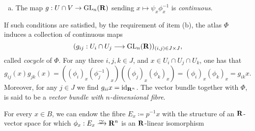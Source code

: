 \begin{definition}
\begin{enumerate}[(a)]
\item The map \(g: U \cap V \to \operatorname{GL}_n(\mathbf{R})\) sending
  \(x \mapsto \psi_x \phi_x^{-1}\) is \emph{continuous}.
\end{enumerate}
If such conditions are satisfied, by the requirement of item (b), the atlas
\(\Phi\) induces a collection of continuous maps
\[
(g_{i j}: U_i \cap U_j \longrightarrow \operatorname{GL}_n(\mathbf{R}))_{(i, j) \in J \times J},
\]
called \emph{cocycle} of \(\Phi\). For any three \(i, j, k \in J\), and
\(x \in U_i \cap U_j \cap U_k\), one has that
\[
g_{ij}(x) g_{j k}(x)
= ((\phi_i)_x (\phi_j^{-1})_x) ((\phi_j)_x (\phi_k)_x)
= (\phi_i)_x (\phi_k)_{x}
= g_{i k} x.
\]
Moreover, for any \(j \in J\) we find \(g_{i i} x = \operatorname{id}_{\mathbf{R}^n}\). The vector
bundle together with \(\Phi\), is said to be a \emph{vector bundle with
  \(n\)-dimensional fibre}.

For every \(x \in B\), we can endow the fibre \(E_x \coloneq p^{-1} x\) with the
structure of an \(\mathbf{R}\)-vector space for which \(\phi_x: E_x \isoto \R^n\) is an
\(\mathbf{R}\)-linear isomorphism
\end{definition}



